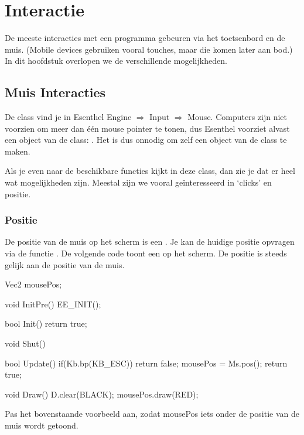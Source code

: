 \chapter{Interactie}
De meeste interacties met een programma gebeuren via het toetsenbord en de muis. (Mobile devices gebruiken vooral touches, maar die komen later aan bod.) In dit hoofdstuk overlopen we de verschillende mogelijkheden.

\section{Muis Interacties}
De class  vind je in Esenthel Engine $\Rightarrow$ Input $\Rightarrow$ Mouse. Computers zijn niet voorzien om meer dan \'e\'en mouse pointer te tonen, dus Esenthel voorziet alvast een object van de class: . Het is dus onnodig om zelf een object van de class  te maken.

Als je even naar de beschikbare functies kijkt in deze class, dan zie je dat er heel wat mogelijkheden zijn. Meestal zijn we vooral ge\"interesseerd in `clicks' en positie.

\subsection{Positie}
De positie van de muis op het scherm is een . Je kan de huidige positie opvragen via de functie . De volgende code toont een  op het scherm. De positie is steeds gelijk aan de positie van de muis. 



\begin{code}
Vec2 mousePos;

void InitPre()
{
   EE_INIT();
}

bool Init()
{   
   return true;
}

void Shut() {}

bool Update()
{
   if(Kb.bp(KB_ESC)) return false;  
   mousePos = Ms.pos();  
   return true;
}

void Draw()
{
   D.clear(BLACK);
   mousePos.draw(RED);
}
\end{code}

\begin{exercise}
Pas het bovenstaande voorbeeld aan, zodat mousePos iets onder de positie van de muis wordt getoond.
\end{exercise} 


